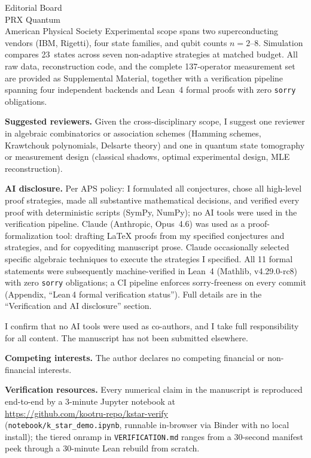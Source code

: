 \documentclass[12pt]{letter}
\newcommand{\paragraph}[1]{\medskip\noindent\textbf{#1}\enspace}
\begin{document}
\begin{letter}{Editorial Board\\
PRX Quantum\\
American Physical Society}
Experimental scope spans two superconducting vendors (IBM,
Rigetti), four state families, and qubit counts $n = 2$--$8$.
Simulation compares 23~states across seven non-adaptive
strategies at matched budget.
All raw data, reconstruction code, and the complete
137-operator measurement set are provided as Supplemental
Material, together with a verification pipeline spanning four
independent backends and Lean~4 formal proofs with
zero \texttt{sorry} obligations.

\paragraph{Suggested reviewers.}
Given the cross-disciplinary scope, I suggest one reviewer in algebraic
combinatorics or association schemes (Hamming schemes, Krawtchouk
polynomials, Delsarte theory) and one in quantum state tomography
or measurement design (classical shadows, optimal experimental
design, MLE reconstruction).

\paragraph{AI disclosure.}
Per APS policy: I formulated all conjectures, chose all high-level
proof strategies, made all substantive mathematical decisions, and
verified every proof with deterministic scripts (SymPy, NumPy);
no AI tools were used in the verification pipeline.
Claude (Anthropic, Opus~4.6) was used as a proof-formalization
tool: drafting LaTeX proofs from my specified conjectures and
strategies, and for copyediting manuscript prose.  Claude
occasionally selected specific algebraic techniques to execute
the strategies I specified.
All 11 formal statements were subsequently machine-verified in
Lean~4 (Mathlib, v4.29.0-rc8) with zero \texttt{sorry} obligations;
a CI pipeline enforces sorry-freeness on every commit
(Appendix, ``Lean\,4 formal verification status'').
Full details are in the ``Verification and AI disclosure'' section.

I confirm that no AI tools were used as co-authors, and I take
full responsibility for all content.  The manuscript has not been
submitted elsewhere.

\paragraph{Competing interests.}
The author declares no competing financial or non-financial interests.

\paragraph{Verification resources.}
Every numerical claim in the manuscript is reproduced
end-to-end by a 3-minute Jupyter notebook at\\
\url{https://github.com/kootru-repo/kstar-verify}\\
(\texttt{notebook/k\_star\_demo.ipynb}, runnable in-browser
via Binder with no local install); the tiered onramp in
\texttt{VERIFICATION.md} ranges from a 30-second manifest
peek through a 30-minute Lean rebuild from scratch.


\end{letter}
\end{document}
